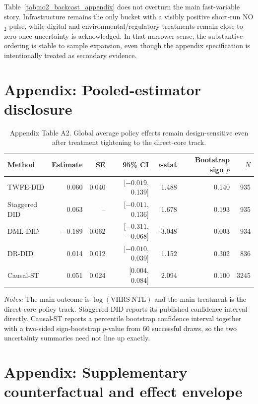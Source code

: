 \documentclass[11pt,a4paper]{article}
\begin{document}
Table~\ref{tab:no2_backcast_appendix} does not overturn the main fast-variable story.
Infrastructure remains the only bucket with a visibly positive short-run NO$_2$ pulse, while digital and environmental/regulatory treatments remain close to zero once uncertainty is acknowledged.
In that narrower sense, the substantive ordering is stable to sample expansion, even though the appendix specification is intentionally treated as secondary evidence.

\section{Appendix: Pooled-estimator disclosure}
\label{app:pooled_disclosure}

\begin{table}[H]
\centering
\caption{Appendix Table A2. Global average policy effects remain design-sensitive even after treatment tightening to the direct-core track.}
\label{tab:core_causal_disclosure_appendix}
\small
\setlength{\tabcolsep}{5pt}
\begin{tabular}{lrrrrrr}
\toprule
Method & Estimate & SE & 95\% CI & $t$-stat & Bootstrap sign $p$ & $N$ \\
\midrule
TWFE-DID & 0.060 & 0.040 & [$-0.019$, 0.139] & 1.488 & 0.140 & 935 \\
Staggered DID & 0.063 & -- & [$-0.011$, 0.136] & 1.678 & 0.193 & 935 \\
DML-DID & $-0.189$ & 0.062 & [$-0.311$, $-0.068$] & $-3.048$ & 0.003 & 934 \\
DR-DID & 0.014 & 0.012 & [$-0.010$, 0.039] & 1.152 & 0.302 & 836 \\
Causal-ST & 0.051 & 0.024 & [0.004, 0.084] & 2.094 & 0.100 & 3245 \\
\bottomrule
\end{tabular}
\end{table}
\FloatBarrier
\noindent\textit{Notes:} The main outcome is $\log(\mathrm{VIIRS\ NTL})$ and the main treatment is the direct-core policy track. Staggered DID reports its published confidence interval directly. Causal-ST reports a percentile bootstrap confidence interval together with a two-sided sign-bootstrap $p$-value from 60 successful draws, so the two uncertainty summaries need not line up exactly.

\section{Appendix: Supplementary counterfactual and effect envelope}
\label{app:counterfactual_envelope}
\end{document}
